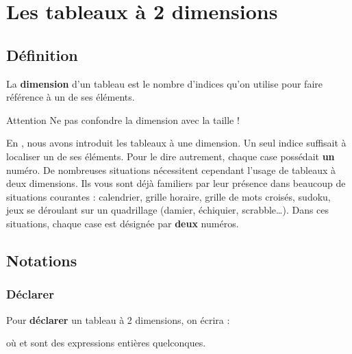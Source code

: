 \chapter{Les tableaux à 2 dimensions}

\section{Définition}

	La \textbf{dimension} d’un tableau est le nombre d’indices qu’on utilise
	pour faire référence à un de ses éléments. 
	
	\begin{infotbox}{Attention}
		Ne pas confondre la dimension avec la taille !
	\end{infotbox}		
	
	En , nous avons introduit les tableaux à une dimension.
	Un seul indice suffisait à localiser un de ses éléments. 
	Pour le dire autrement,
	chaque case possédait \textbf{un} numéro.
	De nombreuses situations nécessitent cependant l’usage de tableaux à deux dimensions.
	Ils vous sont déjà familiers par leur présence dans beaucoup de
	situations courantes : calendrier, grille horaire, grille de mots
	croisés, sudoku, jeux se déroulant sur un quadrillage (damier,
	échiquier, scrabble\dots).
	Dans ces situations, 
	chaque case est désignée par \textbf{deux} numéros.

\section{Notations}

	\subsection{Déclarer}
		
		Pour \textbf{déclarer} un tableau à 2 dimensions, on écrira :
	
		\begin{algo}
			\;
		\end{algo}
	
		où  et  
		sont des expressions entières quelconques.
	
